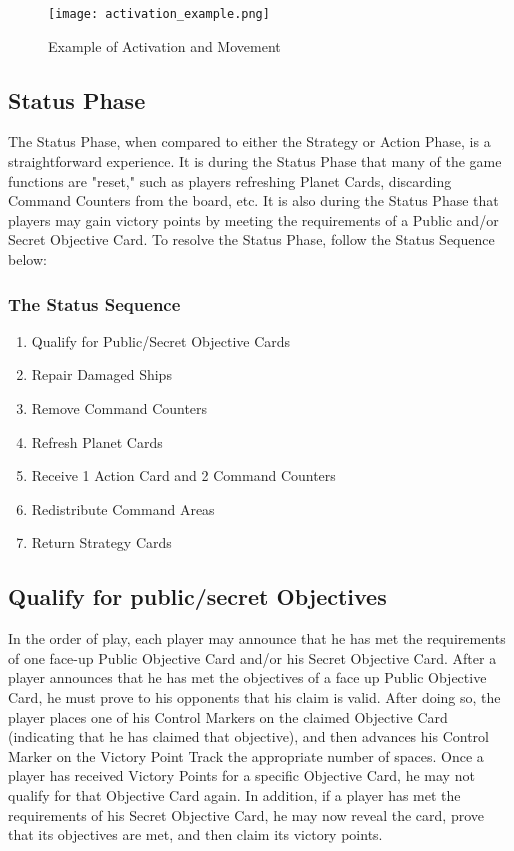 \documentclass[11pt,fleqn]{book} %
\begin{document}
\begin{figure}[h]
\centering
\texttt{[image: activation\_example.png]}
\caption{ Example of Activation and Movement}
\label{fig:example_activation}
\end{figure}

\subsection{Status Phase} %
\label{sub:status_phase}

The Status Phase, when compared to either the Strategy or Action Phase, is a straightforward experience. It is during the Status Phase that many of the game functions are "reset," such as players refreshing Planet Cards, discarding Command Counters from the board, etc. It is also during the Status Phase that players may gain victory points by meeting the requirements of a Public and/or Secret Objective Card. To resolve the Status Phase, follow the Status Sequence below:
\subsubsection{The Status Sequence}
\begin{enumerate}
    \item  Qualify for Public/Secret Objective Cards
\item Repair Damaged Ships
\item Remove Command Counters
\item Refresh Planet Cards
\item Receive 1 Action Card and 2 Command Counters
\item Redistribute Command Areas
\item Return Strategy Cards
\end{enumerate}

\subsection{Qualify for public/secret Objectives} %
\label{sub:qualify_for_public_secret_objectives}        
In the order of play, each player may announce that he has met the requirements of one face-up Public Objective Card and/or his Secret Objective Card.
After a player announces that he has met the objectives of a face up Public Objective Card, he must prove to his opponents that his claim is valid.
After doing so, the player places one of his Control Markers on the claimed Objective Card (indicating that he has claimed that objective), and then advances his Control Marker on the Victory Point Track the appropriate number of spaces.
Once a player has received Victory Points for a specific Objective Card, he may not qualify for that Objective Card again.
In addition, if a player has met the requirements of his Secret Objective Card, he may now reveal the card, prove that its objectives are met, and then claim its victory points.
\end{document}
